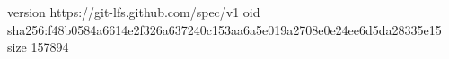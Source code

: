 version https://git-lfs.github.com/spec/v1
oid sha256:f48b0584a6614e2f326a637240c153aa6a5e019a2708e0e24ee6d5da28335e15
size 157894

